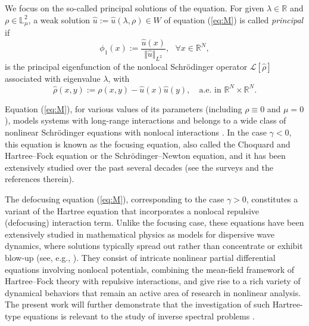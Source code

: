 \documentclass[12pt,thmsa]{article}
\begin{document}
We focus on the so-called principal solutions of the equation. For given $%
\lambda \in \mathbb{R}$ and $\rho \in \mathbb{L}_{\mu }^{2}$, a weak
solution $\hat{u}:=\hat{u}(\lambda ,\rho )\in W$ of equation (\ref{eq:M}) is
called \textit{principal} if
\begin{equation*}
\phi _{1}(x):=\frac{\hat{u}(x)}{\Vert \hat{u}\Vert _{L^{2}}},\text{ }\forall
x\in \mathbb{R}^{N},
\end{equation*}%
is the principal eigenfunction of the nonlocal Schr\"{o}dinger operator $%
\mathcal{L}[\hat{\rho}]$ associated with eigenvalue $\lambda $, with
\begin{equation*}
\hat{\rho}(x,y):=\rho (x,y)-\hat{u}(x)\hat{u}(y),\quad \text{a.e. in }%
\mathbb{R}^{N}\times \mathbb{R}^{N}.
\end{equation*}

Equation (\ref{eq:M}), for various values of its parameters (including $\rho
\equiv 0$ and $\mu =0$), models systems with long-range interactions and
belongs to a wide class of nonlinear Schr\"{o}dinger equations with nonlocal
interactions \cite{Benguria, Bethe, Hartree, Kohn, Lions, LiebSimon,
Penrose, Slater}. In the case $\gamma <0$, this equation is known as the
focusing equation, also called the Choquard and Hartree--Fock equation or
the Schr\"{o}dinger--Newton equation, and it has been extensively studied
over the past several decades (see the surveys \cite{Arora, LeLions,
MorozSurv} and the references therein).

The defocusing equation (\ref{eq:M}), corresponding to the case $\gamma >0$,
constitutes a variant of the Hartree equation \cite{Hartree,Hartree57,
Lions87} that incorporates a nonlocal repulsive (defocusing) interaction
term. Unlike the focusing case, these equations have been extensively
studied in mathematical physics as models for dispersive wave dynamics,
where solutions typically spread out rather than concentrate or exhibit
blow-up (see, e.g., \cite{Benguria, Bourgain, Cao, Ginibre, Miao2007, Tao,
Wang}). They consist of intricate nonlinear partial differential equations
involving nonlocal potentials, combining the mean-field framework of
Hartree--Fock theory with repulsive interactions, and give rise to a rich
variety of dynamical behaviors that remain an active area of research in
nonlinear analysis. The present work will further demonstrate that the
investigation of such Hartree-type equations is relevant to the study of
inverse spectral problems \cite{chadan, glad}.
\end{document}
